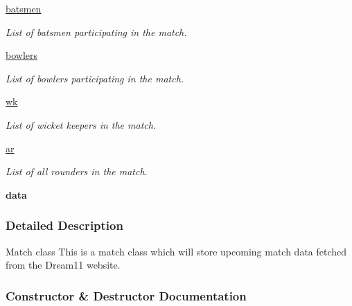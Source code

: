 \begin{DoxyCompactItemize}
\hyperlink{classproject_1_1Match_a439f5a30383147cc4f0d3ef0fc65e57b}{batsmen}
\begin{DoxyCompactList}\small\item\em List of batsmen participating in the match. \end{DoxyCompactList}\item 
\hyperlink{classproject_1_1Match_a72f5836dc303871b4d19b44895b8f012}{bowlers}
\begin{DoxyCompactList}\small\item\em List of bowlers participating in the match. \end{DoxyCompactList}\item 
\hyperlink{classproject_1_1Match_aaed99cf294a0dc51d89caccf11307842}{wk}
\begin{DoxyCompactList}\small\item\em List of wicket keepers in the match. \end{DoxyCompactList}\item 
\hyperlink{classproject_1_1Match_a6179b09b7054234d1a6f248a60f9e7f8}{ar}
\begin{DoxyCompactList}\small\item\em List of all rounders in the match. \end{DoxyCompactList}\item 
\mbox{\label{classproject_1_1Match_ae3395292a14718dbf5ec5ad5d9ca5bee}} 
{\bfseries data}
\end{DoxyCompactItemize}


\subsubsection{Detailed Description}
\begin{DoxyVerb}Match class
This is a match class which will store upcoming match data fetched from the Dream11 website.
\end{DoxyVerb}
 

\subsubsection{Constructor \& Destructor Documentation}
\mbox{\label{classproject_1_1Match_ad2fa413ba7c2d3aee59ab1996aa8ceeb}} 
